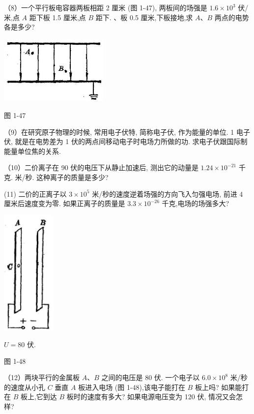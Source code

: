 \documentclass[10pt]{article}
\begin{document}
（8）一个平行板电容器两板相距 2 厘米 (图 1-47), 两板间的场强是 \({1.6} \times {10}^{3}\) 伏/米,点 \(A\) 距下板 1.5 厘米,点 \(B\) 距下. 、板 0.5 厘米,下板接地,求 \(A\text{、}B\) 两点的电势各是多少?

\begin{center}
\includegraphics[max width=0.4\textwidth]{images/01913056-1f15-74d8-9184-9aab52c9d66b_58_602752.jpg}
\end{center}

图 1-47

（9）在研究原子物理的时候, 常用电子伏特, 简称电子伏, 作为能量的单位. 1 电子伏, 就是在电势差为 1 伏的两点间移动电子时电场力所做的功. 求电子伏跟国际制能量单位焦的关系.

（10）二价离子在 90 伏的电压下从静止加速后, 测出它的动量是 \({1.24} \times {10}^{-{21}}\) 千克. 米/秒. 这种离子的质量是多少?

(11) 二价的正离子以 \(3 \times {10}^{5}\) 米/秒的速度逆着场强的方向飞入匀强电场, 前进 4 厘米后速度变为零. 如果正离子的质量是 \({3.3} \times {10}^{-{26}}\) 千克,电场的场强多大?

\begin{center}
\includegraphics[max width=0.2\textwidth]{images/01913056-1f15-74d8-9184-9aab52c9d66b_58_539515.jpg}
\end{center}

\(U = {80}\) 伏.

图 1-48

（12）两块平行的金属板 \(A\text{、}B\) 之间的电压是 80 伏. 一个电子以 \({6.0} \times {10}^{8}\) 米/秒的速度从小孔 \(C\) 垂直 \(A\) 板进入电场 (图 1-48),该电子能打在 \(B\) 板上吗? 如果能打在 \(B\) 板上,它到达 \(B\) 板时的速度有多大? 如果电源电压变为 120 伏, 情况又会怎样?
\end{document}
